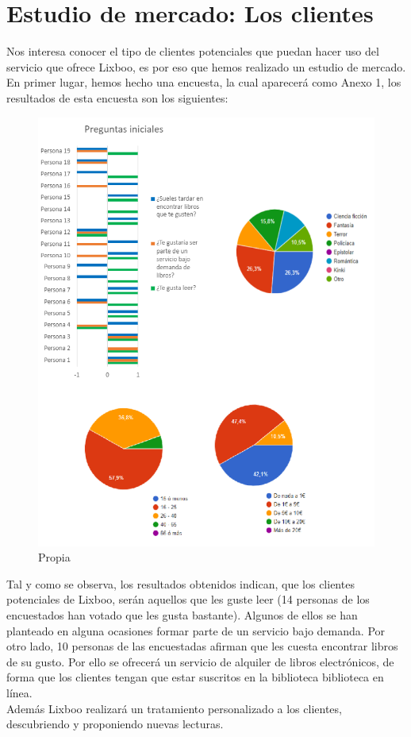 \documentclass[openany,overnay,a4paper, twoside, 12pt]{book}
\begin{document}
\section{Estudio de mercado: Los clientes}
Nos interesa conocer el tipo de clientes potenciales que puedan hacer uso del servicio que ofrece Lixboo, es por eso que hemos realizado un estudio de mercado. En primer lugar, hemos hecho una encuesta, la cual aparecerá como Anexo 1, los resultados de esta encuesta son los siguientes:
\begin{figure}[h]
\centering
\includegraphics[scale = 0.6]{imagenes/encuesta_1.png}
\renewcommand{\figurename}{Resultado de encuesta}
\renewcommand{\figurename}{Fuente}
\caption{Propia}
\end{figure}


Tal y como se observa, los resultados obtenidos indican, que los clientes potenciales de Lixboo, serán aquellos que les guste leer (14 personas de los encuestados han votado que les gusta bastante). Algunos de ellos se han planteado en alguna ocasiones formar parte de un servicio bajo demanda. Por otro lado, 10 personas de las encuestadas afirman que les cuesta encontrar libros de su gusto. Por ello se ofrecerá un servicio  de alquiler de libros electrónicos, de forma que los clientes tengan que estar suscritos en la biblioteca biblioteca en línea. \\Además Lixboo realizará un tratamiento personalizado a los clientes, descubriendo y proponiendo nuevas lecturas.
\setcounter{chapter}{3} %
\end{document}
